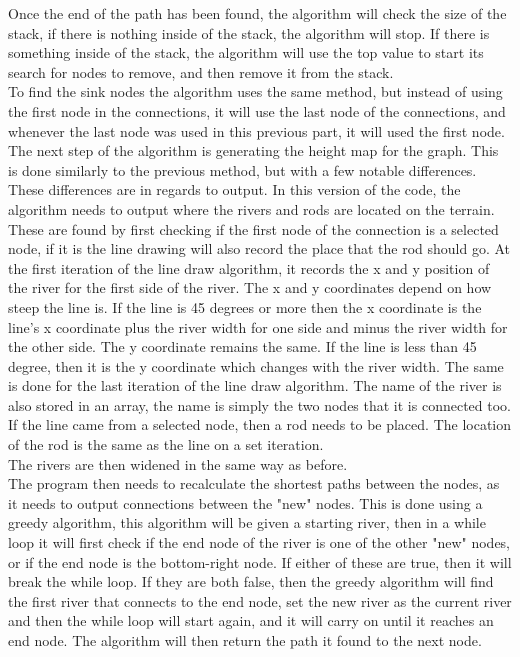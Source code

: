 	Once the end of the path has been found, the algorithm will check the size of the stack, if there is nothing inside of the stack, the algorithm will stop. If there is something inside of the stack, the algorithm will use the top value to start its search for nodes to remove, and then remove it from the stack.\\
	To find the sink nodes the algorithm uses the same method, but instead of using the first node in the connections, it will use the last node of the connections, and whenever the last node was used in this previous part, it will used the first node.\\
	

	The next step of the algorithm is generating the height map for the graph. This is done similarly to the previous method, but with a few notable differences. These differences are in regards to output. In this version of the code, the algorithm needs to output where the rivers and rods are located on the terrain. These are found by first checking if the first node of the connection is a selected node, if it is the line drawing will also record the place that the rod should go. At the first iteration of the line draw algorithm, it records the x and y position of the river for the first side of the river. The x and y coordinates depend on how steep the line is. If the line is 45 degrees or more then the x coordinate is the line's x coordinate plus the river width for one side and minus the river width for the other side. The y coordinate remains the same. If the line is less than 45 degree, then it is the y coordinate which changes with the river width. The same is done for the last iteration of the line draw algorithm. The name of the river is also stored in an array, the name is simply the two nodes that it is connected too. If the line came from a selected node, then a rod needs to be placed. The location of the rod is the same as the line on a set iteration.\\


	The rivers are then widened in the same way as before.\\
	The program then needs to recalculate the shortest paths between the nodes, as it needs to output connections between the "new" nodes. This is done using a greedy algorithm, this algorithm will be given a starting river, then in a while loop it will first check if the end node of the river is one of the other "new" nodes, or if the end node is the bottom-right node. If either of these are true, then it will break the while loop. If they are both false, then the greedy algorithm will find the first river that connects to the end node, set the new river as the current river and then the while loop will start again, and it will carry on until it reaches an end node. The algorithm will then return the path it found to the next node.\\

